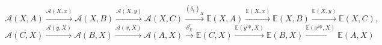 \documentclass[preview]{standalone}
\begin{document}
\begin{center}
$$\mathscr{A}(X,A) \xrightarrow{\mathscr{A}(X,x)} \mathscr{A}(X,B) \xrightarrow{\mathscr{A}(X,y)} \mathscr{A}(X,C) \xrightarrow{(\delta_\sharp)_X} \mathbb{E}(X,A) \xrightarrow{\mathbb{E}(X,x)} \mathbb{E}(X,B) \xrightarrow{\mathbb{E}(X,y)} \mathbb{E}(X,C),$$$$\mathscr{A}(C,X) \xrightarrow{\mathscr{A}(y,X)} \mathscr{A}(B,X) \xrightarrow{\mathscr{A}(x,X)} \mathscr{A}(A,X) \xrightarrow{\delta^\sharp_X} \mathbb{E}(C,X) \xrightarrow{\mathbb{E}(y^\text{op},X)} \mathbb{E}(B,X) \xrightarrow{\mathbb{E}(x^\text{op},X)} \mathbb{E}(A,X)$$
\end{center}
\end{document}
